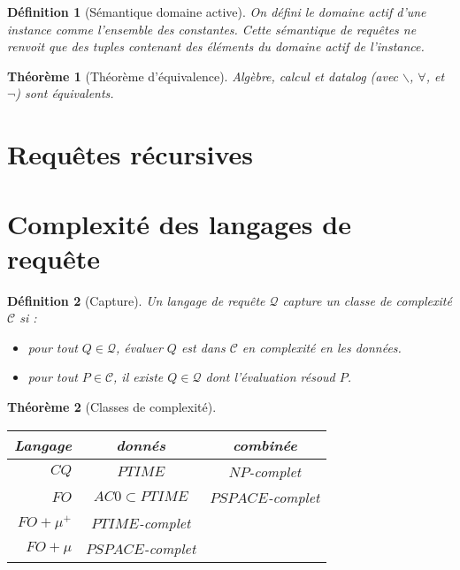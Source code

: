 \documentclass[landscape]{article}
\newcommand{\C}{\mathscr{C}}
\newcommand{\Q}{\mathscr{Q}}
\newcommand{\1}{\mathbbm{1}}
\newtheorem{theo}{Théorème}
\newtheorem{defi}{Définition}
\begin{document}
\begin{multicols}{2}
    \begin{defi}[Sémantique domaine active]
        On défini le domaine actif d'une instance comme l'ensemble des constantes.
        Cette sémantique de requêtes ne renvoit que des tuples contenant des éléments
        du domaine actif de l'instance.
    \end{defi}

    \begin{theo}[Théorème d'équivalence]
        Algèbre, calcul et datalog (avec $\backslash$, $\forall$, et $\neg$) sont
        équivalents.
    \end{theo}

    \section{Requêtes récursives}


    \section{Complexité des langages de requête}

    \begin{defi}[Capture] Un langage de requête $\Q$ capture un classe de complexité
        $\C$ si :\begin{itemize}
            \item pour tout $Q\in\Q$, évaluer $Q$ est dans $\C$ en complexité
                en les données.
            \item pour tout $P\in\C$, il existe $Q\in\Q$ dont l'évaluation
                résoud $P$.
        \end{itemize}
    \end{defi}

    \begin{theo}[Classes de complexité]
        \begin{tabular}{r|cc}
            \hline Langage & donnés & combinée \\
            \hline
            $CQ$ & $PTIME$ & $NP$-complet \\
            $FO$ & $AC0\subset PTIME$ & $PSPACE$-complet \\
            $FO+\mu^+$ & $PTIME$-complet & \\
            $FO+\mu$ & $PSPACE$-complet & \\
            \hline
        \end{tabular}
    \end{theo}


\end{multicols}
\end{document}
